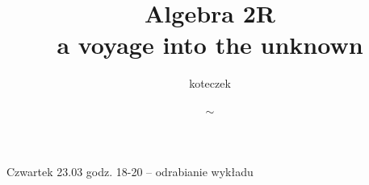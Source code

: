 \documentclass{article}
\title{Algebra 2R\smallskip\\{\scriptsize a voyage into the unknown}}
\author{koteczek}
\date{$\sim$}
\begin{document}
\maketitle
\thispagestyle{empty}
\newpage

Czwartek 23.03 godz. 18-20 -- odrabianie wykładu












\tableofcontents

\newpage
\end{document}
